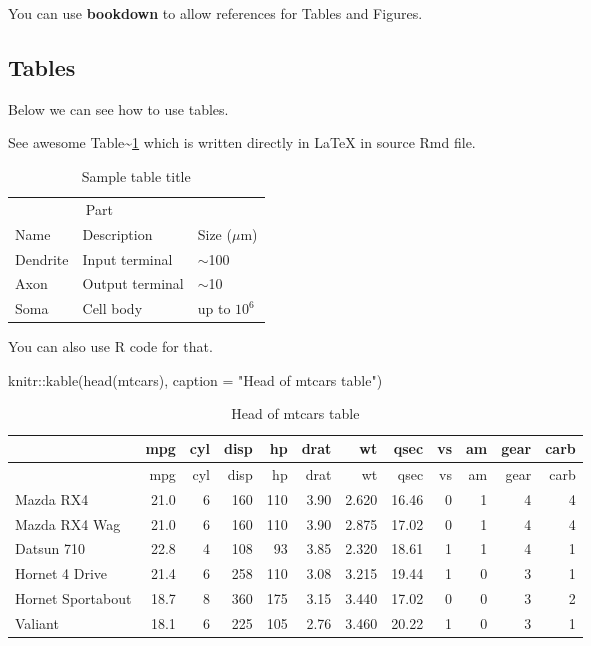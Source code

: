 \documentclass{article}
\newenvironment{Shaded}{\begin{snugshade}}{\end{snugshade}}
\newcommand{\AttributeTok}[1]{\textcolor[rgb]{0.77,0.63,0.00}{#1}}
\newcommand{\FunctionTok}[1]{\textcolor[rgb]{0.00,0.00,0.00}{#1}}
\newcommand{\NormalTok}[1]{#1}
\newcommand{\SpecialCharTok}[1]{\textcolor[rgb]{0.00,0.00,0.00}{#1}}
\newcommand{\StringTok}[1]{\textcolor[rgb]{0.31,0.60,0.02}{#1}}
\begin{document}
You can use \textbf{bookdown} to allow references for Tables and
Figures.

\hypertarget{tables}{%
\subsection{Tables}\label{tables}}

Below we can see how to use tables.

See awesome Table\textasciitilde{}\ref{tab:table} which is written
directly in LaTeX in source Rmd file.

\begin{table}
 \caption{Sample table title}
  \centering
  \begin{tabular}{lll}
    \toprule
    \multicolumn{2}{c}{Part}                   \\
    \cmidrule(r){1-2}
    Name     & Description     & Size ($\mu$m) \\
    \midrule
    Dendrite & Input terminal  & $\sim$100     \\
    Axon     & Output terminal & $\sim$10      \\
    Soma     & Cell body       & up to $10^6$  \\
    \bottomrule
  \end{tabular}
  \label{tab:table}
\end{table}

You can also use R code for that.

\begin{Shaded}
\begin{Highlighting}[]
\NormalTok{knitr}\SpecialCharTok{::}\FunctionTok{kable}\NormalTok{(}\FunctionTok{head}\NormalTok{(mtcars), }\AttributeTok{caption =} \StringTok{"Head of mtcars table"}\NormalTok{)}
\end{Highlighting}
\end{Shaded}

\begin{longtable}[]{@{}lrrrrrrrrrrr@{}}
\caption{Head of mtcars table}\tabularnewline
\toprule
& mpg & cyl & disp & hp & drat & wt & qsec & vs & am & gear & carb \\
\midrule
\endfirsthead
\toprule
& mpg & cyl & disp & hp & drat & wt & qsec & vs & am & gear & carb \\
\midrule
\endhead
Mazda RX4 & 21.0 & 6 & 160 & 110 & 3.90 & 2.620 & 16.46 & 0 & 1 & 4 &
4 \\
Mazda RX4 Wag & 21.0 & 6 & 160 & 110 & 3.90 & 2.875 & 17.02 & 0 & 1 & 4
& 4 \\
Datsun 710 & 22.8 & 4 & 108 & 93 & 3.85 & 2.320 & 18.61 & 1 & 1 & 4 &
1 \\
Hornet 4 Drive & 21.4 & 6 & 258 & 110 & 3.08 & 3.215 & 19.44 & 1 & 0 & 3
& 1 \\
Hornet Sportabout & 18.7 & 8 & 360 & 175 & 3.15 & 3.440 & 17.02 & 0 & 0
& 3 & 2 \\
Valiant & 18.1 & 6 & 225 & 105 & 2.76 & 3.460 & 20.22 & 1 & 0 & 3 & 1 \\
\bottomrule
\end{longtable}
\end{document}
